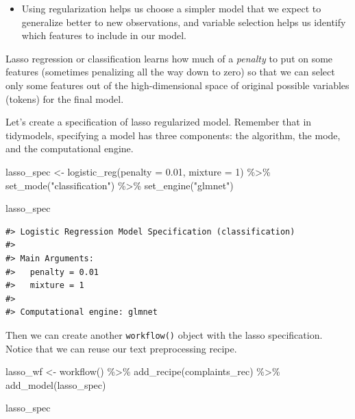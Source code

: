 \documentclass[
]{krantz}
\makeatletter
\newenvironment{Shaded}{\begin{snugshade}}{\end{snugshade}}
\newcommand{\AttributeTok}[1]{\textcolor[rgb]{0.77,0.63,0.00}{#1}}
\newcommand{\DecValTok}[1]{\textcolor[rgb]{0.00,0.00,0.81}{#1}}
\newcommand{\FloatTok}[1]{\textcolor[rgb]{0.00,0.00,0.81}{#1}}
\newcommand{\FunctionTok}[1]{\textcolor[rgb]{0.00,0.00,0.00}{#1}}
\newcommand{\NormalTok}[1]{#1}
\newcommand{\OtherTok}[1]{\textcolor[rgb]{0.56,0.35,0.01}{#1}}
\newcommand{\SpecialCharTok}[1]{\textcolor[rgb]{0.00,0.00,0.00}{#1}}
\newcommand{\StringTok}[1]{\textcolor[rgb]{0.31,0.60,0.02}{#1}}
\newenvironment{kframe}{%
\medskip{}
\setlength{\fboxsep}{.8em}
 \def\at@end@of@kframe{}%
 \ifinner\ifhmode%
  \def\at@end@of@kframe{\end{minipage}}%
  \begin{minipage}{\columnwidth}%
 \fi\fi%
 \def\FrameCommand##1{\hskip\@totalleftmargin \hskip-\fboxsep
 \colorbox{shadecolor}{##1}\hskip-\fboxsep
     \hskip-\linewidth \hskip-\@totalleftmargin \hskip\columnwidth}%
 \MakeFramed {\advance\hsize-\width
   \@totalleftmargin\z@ \linewidth\hsize
   \@setminipage}}%
 {\par\unskip\endMakeFramed%
 \at@end@of@kframe}
\renewenvironment{Shaded}{\begin{kframe}}{\end{kframe}}
\newenvironment{rmdblock}[1]
  {\begin{shaded*}
  \begin{itemize}[left = -1cm, labelsep = 1cm]
  \renewcommand{\labelitemi}{
    \raisebox{-.7\height}[0pt][0pt]{
      {\setkeys{Gin}{width=3em,keepaspectratio}\texttt{[image: images/\#1]}}
    }
  }
 
  \item
  }
  {
  \end{itemize}
  \end{shaded*}
  }
\newenvironment{rmdnote}
  {\begin{rmdblock}{note}}
  {\end{rmdblock}}
\makeatother
\begin{document}
\begin{rmdnote}
Using regularization helps us choose a simpler model that we expect to
generalize better to new observations, and variable selection helps us
identify which features to include in our model.
\end{rmdnote}

Lasso regression or classification learns how much of a \emph{penalty} to put on some features (sometimes penalizing all the way down to zero) so that we can select only some features out of the high-dimensional space of original possible variables (tokens) for the final model.

Let's create a specification of lasso regularized model. Remember that in tidymodels, specifying a model has three components: the algorithm, the mode, and the computational engine.

\begin{Shaded}
\begin{Highlighting}[]
\NormalTok{lasso\_spec }\OtherTok{\textless{}{-}} \FunctionTok{logistic\_reg}\NormalTok{(}\AttributeTok{penalty =} \FloatTok{0.01}\NormalTok{, }\AttributeTok{mixture =} \DecValTok{1}\NormalTok{) }\SpecialCharTok{\%\textgreater{}\%}
  \FunctionTok{set\_mode}\NormalTok{(}\StringTok{"classification"}\NormalTok{) }\SpecialCharTok{\%\textgreater{}\%}
  \FunctionTok{set\_engine}\NormalTok{(}\StringTok{"glmnet"}\NormalTok{)}

\NormalTok{lasso\_spec}
\end{Highlighting}
\end{Shaded}

\begin{verbatim}
#> Logistic Regression Model Specification (classification)
#> 
#> Main Arguments:
#>   penalty = 0.01
#>   mixture = 1
#> 
#> Computational engine: glmnet
\end{verbatim}

Then we can create another \texttt{workflow()} object with the lasso specification. Notice that we can reuse our text preprocessing recipe.

\begin{Shaded}
\begin{Highlighting}[]
\NormalTok{lasso\_wf }\OtherTok{\textless{}{-}} \FunctionTok{workflow}\NormalTok{() }\SpecialCharTok{\%\textgreater{}\%}
  \FunctionTok{add\_recipe}\NormalTok{(complaints\_rec) }\SpecialCharTok{\%\textgreater{}\%}
  \FunctionTok{add\_model}\NormalTok{(lasso\_spec)}

\NormalTok{lasso\_spec}
\end{Highlighting}
\end{Shaded}
\end{document}
